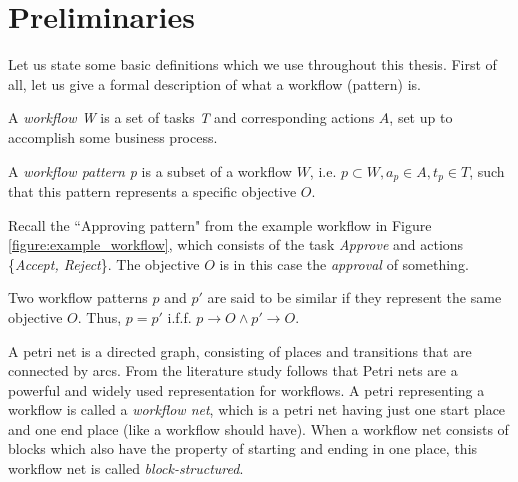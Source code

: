 \documentclass[a4paper,11pt]{article}
\begin{document}
\section{Preliminaries}
\label{section:preliminaries}
Let us state some basic definitions which we use throughout this thesis.
First of all, let us give a formal description of what a workflow (pattern) is.
\begin{defn}[Workflow]
A \textit{workflow W} is a set of tasks \textit{T} and corresponding actions $A$, set up to accomplish some business process.
\end{defn}

\begin{defn}
A \textit{workflow pattern p} is a subset of a workflow $W$, i.e. $p \subset W, a_p \in A, t_p \in T$, such that this pattern represents a specific objective $O$.
\end{defn}
Recall the ``Approving pattern" from the example workflow in Figure \ref{figure:example_workflow}, which consists of the task \textit{Approve} and actions \{\textit{Accept, Reject}\}. The objective $O$ is in this case the \textit{approval} of something.

\begin{defn}
Two workflow patterns $p$ and $p'$ are said to be similar if they represent the same objective $O$. Thus, $p=p'$ i.f.f. $p \rightarrow O \wedge p' \rightarrow O$.
\end{defn}

\begin{defn}
A petri net is a directed graph, consisting of places and transitions that are connected by arcs. From the literature study follows that Petri nets are a powerful and widely used representation for workflows. A petri representing a workflow is called a \textit{workflow net}, which is a petri net having just one start place and one end place (like a workflow should have). When a workflow net consists of blocks which also have the property of starting and ending in one place, this workflow net is called \textit{block-structured}. 
\end{defn}
\end{document}
